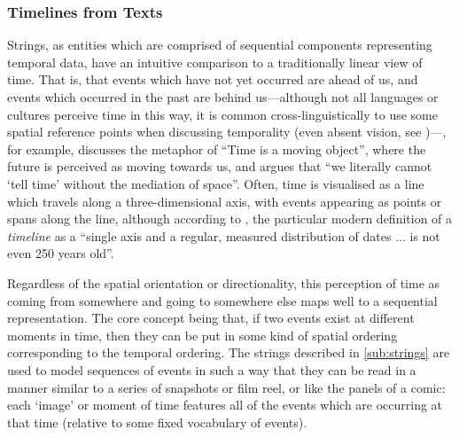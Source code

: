 \documentclass[a4paper,12pt,leqno]{article}
\newcommand{\nb}[1]{{\color{red}[NB\footnote{{\color{red}#1}}]}}
\begin{document}
\subsubsection{Timelines from Texts}\label{ssub:timelines}
Strings, as entities which are comprised of sequential components representing temporal data, have an intuitive comparison to a traditionally linear view of time. That is, that events which have not yet occurred are ahead of us, and events which occurred in the past are behind us---although not all languages or cultures perceive time in this way, it is common cross-linguistically to use some spatial reference points when discussing temporality
(even absent vision, see \citet{bottini2015space})---\citet[pp. 42--43]{lakoff2008metaphors}, for example, discusses the metaphor of ``Time is a moving object'', where the future is perceived as moving towards us, and \citet[p. 542]{mitchell1980spatial} argues that ``we literally cannot `tell time' without the mediation of space''. Often, time is visualised as a line which travels along a three-dimensional axis, with events appearing as points or spans along the line, although according to \citet[p. 14]{rosenberg2013cartographies}, the particular modern definition of a \textit{timeline} as a ``single axis and a regular, measured distribution of dates ... is not even 250 years old''.

Regardless of the spatial orientation or directionality, this perception of time as coming from somewhere and going to somewhere else maps well to a sequential representation. The core concept being that, if two events exist at different moments in time, then they can be put in some kind of spatial ordering corresponding to the temporal ordering. The strings described in \cref{sub:strings} are used to model sequences of events in such a way that they can be read in a manner similar to a series of snapshots or film reel, or like the panels of a comic: each `image' or moment of time features all of the events which are occurring at that time (relative to some fixed vocabulary of events).
\end{document}
